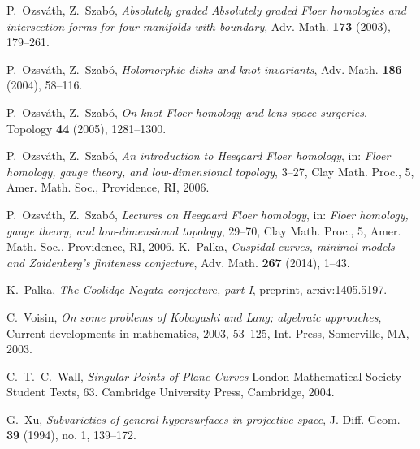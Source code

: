 \documentclass[11pt]{amsart}
\numberwithin{equation}{section}
\theoremstyle{plain}
\theoremstyle{definition}
\begin{document}
\begin{thebibliography}{XXX}
 P.~Ozsv\'ath, Z.~Szab\'o, \emph{Absolutely graded Absolutely graded Floer homologies and intersection 
forms for four-manifolds with boundary},
Adv. Math. \textbf{173} (2003), 179--261.

 P.~Ozsv\'ath, Z.~Szab\'o,
\emph{Holomorphic disks and knot invariants},
Adv. Math. \textbf{186} (2004),  58--116.

 P.~Ozsv\'ath, Z.~Szab\'o, \emph{On knot Floer homology and lens space surgeries},
Topology \textbf{44} (2005),   1281--1300.

 P.~Ozsv\'ath, Z.~Szab\'o,  \textit{An introduction to Heegaard Floer homology}, in:  \textit{Floer homology, gauge theory, and
   low-dimensional topology}, 3--27, Clay Math. Proc., 5, Amer. Math. Soc., Providence, RI, 2006.

 P.~Ozsv\'ath, Z.~Szab\'o,  \textit{Lectures on Heegaard Floer homology}, in:  \textit{Floer 
homology, gauge theory, and low-dimensional topology}, 29--70,
   Clay Math. Proc., 5, Amer. Math. Soc., Providence, RI, 2006.
 K.~Palka, \emph{Cuspidal curves, minimal models and Zaidenberg's finiteness conjecture},  Adv. Math. \textbf{267} (2014), 1--43. 

 K.~Palka, \emph{The Coolidge-Nagata conjecture, part I}, preprint, arxiv:1405.5197.

 C.~Voisin, \emph{On some problems of Kobayashi and Lang; algebraic approaches}, Current developments in mathematics, 2003, 53--125, 
Int. Press, Somerville, MA, 2003. 

 C.~T.~C.~Wall, \textit{Singular Points of Plane Curves}
London Mathematical Society Student Texts, 63. Cambridge University Press, Cambridge, 2004.

 G.~Xu,
\emph{Subvarieties of general hypersurfaces in projective space},
J. Diff. Geom. \textbf{39} (1994), no. 1, 139--172. 
\end{thebibliography}
\end{document}
